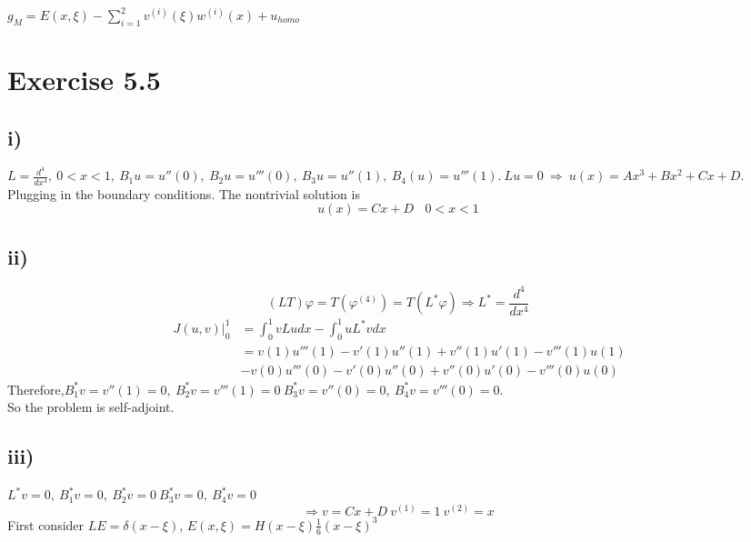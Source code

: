 \documentclass[a4paper, 11pt]{article}
\begin{document}
\begin{spacing}{1.5}
$g_M = E(x,\xi) - \sum_{i=1}^{2}v^{(i)}(\xi) w^{(i)}(x) + u_{homo}$


\section*{Exercise 5.5}
\subsection*{i)}
$L = \frac{d^4}{dx^4}, \ 0<x<1, \ B_1u=u''(0) , \ B_2u=u'''(0), \ B_3u=u''(1), \ B_4(u) = u'''(1). \ Lu=0 \  \Rightarrow \ u(x) = Ax^3 + Bx^2 + Cx + D$. \\
Plugging in the boundary conditions. The nontrivial solution is 
$$
u(x) = Cx+D  \ \ \ \ 0<x<1
$$

\subsection*{ii)}
$$
(LT) \varphi = T(\varphi^{(4)}) = T(L^*\varphi) \Rightarrow L^* = \frac{d^4}{dx^4}
$$
\begin{align*}\
J(u,v)\Big|_0^1 
& = \int_{0}^{1} vLudx - \int_{0}^{1} uL^*vdx  \\
& = v(1) u'''(1) - v'(1)u''(1) + v''(1) u'(1) -  v'''(1)u(1)  \\
& -  v(0) u'''(0) - v'(0)u''(0) + v''(0) u'(0) - v'''(0) u(0) 
\end{align*}
Therefore,$ B_1^*v = v''(1) =0 , \ B_2^*v = v'''(1) = 0 \ B_3^*v = v''(0) = 0 , \ B_4^*v = v'''(0) = 0$. \\
So the problem is self-adjoint.

\subsection*{iii)}
$L^*v=0, \ B_1^*v = 0 , \ B_2^*v = 0 \ B_3^*v = 0 , \ B_4^*v = 0$
$$
\Rightarrow v= Cx+D \ v^{(1)} = 1 \ v^{(2)} = x
$$
First consider $LE=\delta(x-\xi)$, $E(x,\xi) = H(x-\xi) \frac{1}{6} (x-\xi)^3$

\end{spacing}
\end{document}
